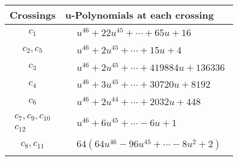 \documentclass[1p]{elsarticle_modified}
\theoremstyle{definition}
\begin{document}
\begin{tabular}{m{50pt}|m{274pt}}
Crossings & \hspace{64pt}u-Polynomials at each crossing \\
\hline $$\begin{aligned}c_{1}\end{aligned}$$&$\begin{aligned}
&u^{46}+22 u^{45}+\cdots+65 u+16
\end{aligned}$\\
\hline $$\begin{aligned}c_{2},c_{5}\end{aligned}$$&$\begin{aligned}
&u^{46}+2 u^{45}+\cdots+15 u+4
\end{aligned}$\\
\hline $$\begin{aligned}c_{3}\end{aligned}$$&$\begin{aligned}
&u^{46}+2 u^{45}+\cdots+419884 u+136336
\end{aligned}$\\
\hline $$\begin{aligned}c_{4}\end{aligned}$$&$\begin{aligned}
&u^{46}+3 u^{45}+\cdots+30720 u+8192
\end{aligned}$\\
\hline $$\begin{aligned}c_{6}\end{aligned}$$&$\begin{aligned}
&u^{46}+2 u^{44}+\cdots+2032 u+448
\end{aligned}$\\
\hline $$\begin{aligned}c_{7},c_{9},c_{10}\\c_{12}\end{aligned}$$&$\begin{aligned}
&u^{46}+6 u^{45}+\cdots-6 u+1
\end{aligned}$\\
\hline $$\begin{aligned}c_{8},c_{11}\end{aligned}$$&$\begin{aligned}
&64(64 u^{46}-96 u^{45}+\cdots-8 u^2+2)
\end{aligned}$\\
\hline
\end{tabular}\\~\\
\end{document}

